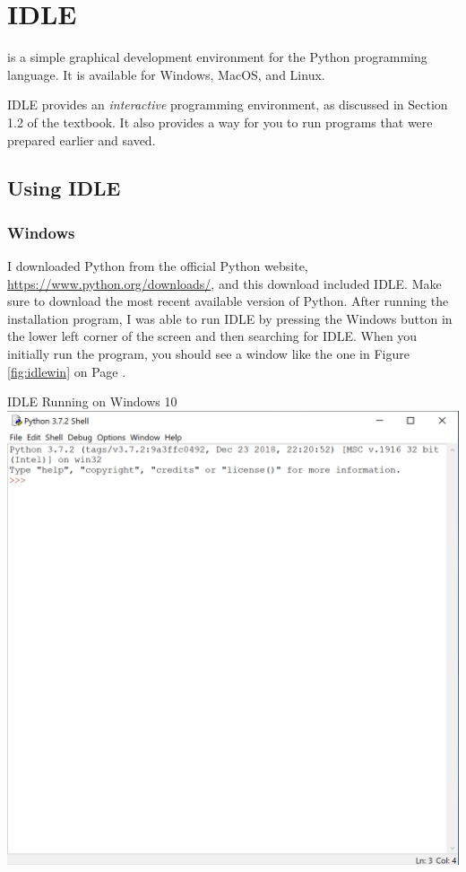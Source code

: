 
\chapter{IDLE}
\label{chapter:idle}

 is a simple graphical development environment for the Python programming language.  It is available for Windows, MacOS, and Linux.

IDLE provides an \textit{interactive} programming environment, as discussed in Section 1.2 of the textbook.  It also provides a way for you to run programs that were prepared earlier and saved.

\section{Using IDLE}

\subsection{Windows}

I downloaded Python from the official Python website, \url{https://www.python.org/downloads/}, and this download included IDLE.  Make sure to download the most recent available version of Python.  After running the installation program, I was able to run IDLE by pressing the Windows button in the lower left corner of the screen and then searching for IDLE.  When you initially run the program, you should see a window like the one in Figure \ref{fig:idlewin} on Page \pageref{fig:idlewin}.

\begin{myfigure}[label=fig:idlewin]{IDLE Running on Windows 10}
    \centering
    \includegraphics[scale=0.6]{screenshots/idlewin.png}
\end{myfigure}

